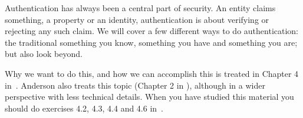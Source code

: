 Authentication has always been a central part of security.
An entity claims something, a property or an identity, authentication is about 
verifying or rejecting any such claim.
We will cover a few different ways to do authentication: the traditional 
something you know, something you have and something you are; but also look 
beyond.

Why we want to do this, and how we can accomplish this is treated in Chapter 
4 in~\cite{Gollmann2011cs}.
Anderson also treats this topic (Chapter 2 in \cite{Anderson2008sea}), although 
in a wider perspective with less technical details.
When you have studied this material you should do exercises 4.2, 4.3, 4.4 and 
4.6 in~\cite{Gollmann2011cs}.
